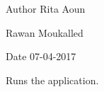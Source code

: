 \begin{DoxyAuthor}{\-Author}
\-Rita \-Aoun 

\-Rawan \-Moukalled 
\end{DoxyAuthor}
\begin{DoxyDate}{\-Date}
07-\/04-\/2017
\end{DoxyDate}
\-Runs the application. 